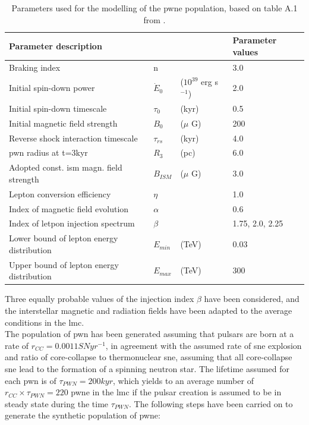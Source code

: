 \documentclass[main.tex]{subfiles}
\begin{document}
\begin{table}
  \centering
  \begin{tabular}{llll}
    \hline
    Parameter description & & & Parameter values \\
    \hline
    Braking index & n &  & 3.0 \\
    Initial spin-down power & $\dot E_{0}$ & ($10^{39}$ erg s$^{-1}$) & 2.0 \\
    Initial spin-down timescale &$\tau_{0}$ & (kyr) & 0.5 \\
    Initial magnetic field strength & $B_{0}$ & ($\mu$ G) & 200\\
    Reverse shock interaction timescale & $\tau_{rs}$ & (kyr) & 4.0 \\
    \gls{pwn} radius at t=3kyr & $R_{3}$ & (pc) & 6.0 \\
    Adopted const. \gls{ism} magn. field strength & $B_{ISM}$ &($\mu$ G) & 3.0 \\
    Lepton conversion efficiency & $\eta$ & & 1.0 \\
    Index of magnetic field evolution & $\alpha$ & & 0.6 \\
    Index of letpon injection spectrum & $\beta$ & & 1.75, 2.0, 2.25\\
    Lower bound of lepton energy distribution & $E_{min}$ & (TeV) & 0.03 \\
    Upper bound of lepton energy distribution & $E_{max}$ & (TeV) & 300\\
    \hline
  \end{tabular}
  \caption{Parameters used for the modelling of the \gls{pwne} population, based on table A.1 from \cite{2018hessPWNe}.}
  \label{tab:baselinemodelpwne}
\end{table}

Three equally probable values of the injection index $\beta$ have been considered, and the interstellar magnetic and radiation fields have been adapted to the average conditions in the \gls{lmc}.\\
The population of \gls{pwn} has been generated assuming that pulsars are born at a rate of $r_{CC} = 0.0011 SN yr^{-1}$, in agreement with the assumed rate of \gls{sne} explosion and ratio of core-collapse to thermonuclear \gls{sne}, assuming that all core-collapse \gls{sne} lead to the formation of a spinning neutron star. The lifetime assumed for each \gls{pwn} is of $\tau_{PWN} = 200 kyr$, which yields to an average number of $r_{CC} \times \tau_{PWN} = 220$ \gls{pwne} in the \gls{lmc} if the pulsar creation is assumed to be in steady state during the time $\tau_{PWN}$. The following steps have been carried on to generate the synthetic population of \gls{pwne}:
\end{document}
